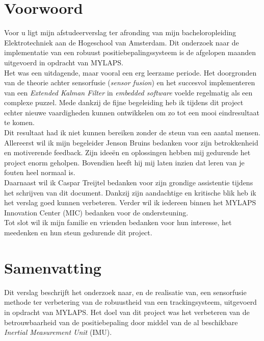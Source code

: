\section*{Voorwoord}

Voor u ligt mijn afstudeerverslag ter afronding van mijn bacheloropleiding Elektrotechniek aan de Hogeschool van Amsterdam. Dit onderzoek naar de implementatie van een robuust positiebepalingssysteem is de afgelopen maanden uitgevoerd in opdracht van MYLAPS. \\

Het was een uitdagende, maar vooral een erg leerzame periode. Het doorgronden van de theorie achter sensorfusie (\textit{sensor fusion}) en het succesvol implementeren van een \textit{Extended Kalman Filter} in \textit{embedded software} voelde regelmatig als een complexe puzzel. Mede dankzij de fijne begeleiding heb ik tijdens dit project echter nieuwe vaardigheden kunnen ontwikkelen om zo tot een mooi eindresultaat te komen. \\

Dit resultaat had ik niet kunnen bereiken zonder de steun van een aantal mensen. Allereerst wil ik mijn begeleider Jenson Bruins bedanken voor zijn betrokkenheid en motiverende feedback. Zijn ideeën en oplossingen hebben mij gedurende het project enorm geholpen. Bovendien heeft hij mij laten inzien dat leren van je fouten heel normaal is. \\

Daarnaast wil ik Caspar Treijtel bedanken voor zijn grondige assistentie tijdens het schrijven van dit document. Dankzij zijn aandachtige en kritische blik heb ik het verslag goed kunnen verbeteren. Verder wil ik iedereen binnen het MYLAPS Innovation Center (MIC) bedanken voor de ondersteuning. \\

Tot slot wil ik mijn familie en vrienden bedanken voor hun interesse, het meedenken en hun steun gedurende dit project.

\newpage

\section*{Samenvatting}

Dit verslag beschrijft het onderzoek naar, en de realisatie van, een sensorfusie methode ter verbetering van de robuustheid van een trackingsysteem, uitgevoerd in opdracht van MYLAPS. Het doel van dit project was het verbeteren van de betrouwbaarheid van de positiebepaling door middel van de al beschikbare \textit{Inertial Measurement Unit} (IMU). \\

